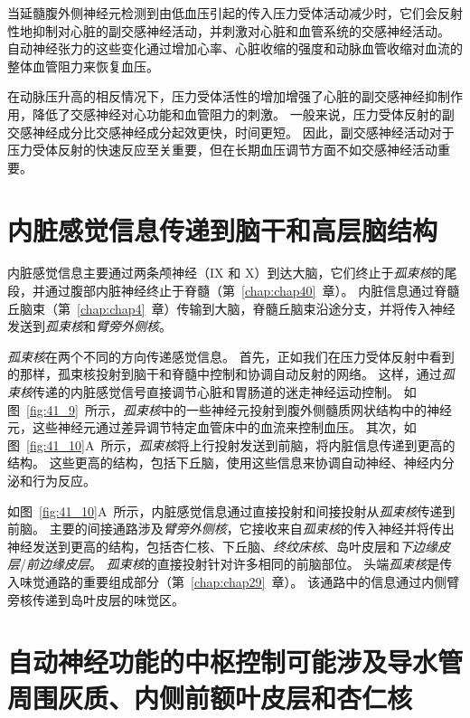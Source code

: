 当延髓腹外侧神经元检测到由低血压引起的传入压力受体活动减少时，它们会反射性地抑制对心脏的副交感神经活动，并刺激对心脏和血管系统的交感神经活动。
自动神经张力的这些变化通过增加心率、心脏收缩的强度和动脉血管收缩对血流的整体血管阻力来恢复血压。


在动脉压升高的相反情况下，压力受体活性的增加增强了心脏的副交感神经抑制作用，降低了交感神经对心功能和血管阻力的刺激。
一般来说，压力受体反射的副交感神经成分比交感神经成分起效更快，时间更短。
因此，副交感神经活动对于压力受体反射的快速反应至关重要，但在长期血压调节方面不如交感神经活动重要。



\section{内脏感觉信息传递到脑干和高层脑结构}

内脏感觉信息主要通过两条颅神经（IX 和 X）到达大脑，它们终止于\textit{孤束核}的尾段，并通过腹部内脏神经终止于脊髓（第~\ref{chap:chap40}~章）。
内脏信息通过脊髓丘脑束（第~\ref{chap:chap4}~章）传输到大脑，脊髓丘脑束沿途分支，并将传入神经发送到\textit{孤束核}和\textit{臂旁外侧核}。


\textit{孤束核}在两个不同的方向传递感觉信息。
首先，正如我们在压力受体反射中看到的那样，孤束核投射到脑干和脊髓中控制和协调自动反射的网络。
这样，通过\textit{孤束核}传递的内脏感觉信号直接调节心脏和胃肠道的迷走神经运动控制。
如图~\ref{fig:41_9}~所示，\textit{孤束核}中的一些神经元投射到腹外侧髓质网状结构中的神经元，这些神经元通过差异调节特定血管床中的血流来控制血压。
其次，如图~\ref{fig:41_10}A~所示，\textit{孤束核}将上行投射发送到前脑，将内脏信息传递到更高的结构。
这些更高的结构，包括下丘脑，使用这些信息来协调自动神经、神经内分泌和行为反应。


如图~\ref{fig:41_10}A~所示，内脏感觉信息通过直接投射和间接投射从\textit{孤束核}传递到前脑。
主要的间接通路涉及\textit{臂旁外侧核}，它接收来自\textit{孤束核}的传入神经并将传出神经发送到更高的结构，包括杏仁核、下丘脑、\textit{终纹床核}、岛叶皮层和\textit{下边缘皮层}/\textit{前边缘皮层}。
\textit{孤束核}的直接投射针对许多相同的前脑部位。
头端\textit{孤束核}是传入味觉通路的重要组成部分（第~\ref{chap:chap29}~章）。
该通路中的信息通过内侧臂旁核传递到岛叶皮层的味觉区。



\section{自动神经功能的中枢控制可能涉及导水管周围灰质、内侧前额叶皮层和杏仁核}


